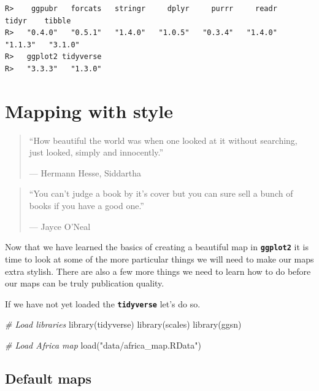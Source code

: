\documentclass[
]{book}
\newenvironment{Shaded}{\begin{snugshade}}{\end{snugshade}}
\newcommand{\CommentTok}[1]{\textcolor[rgb]{0.56,0.35,0.01}{\textit{#1}}}
\newcommand{\FunctionTok}[1]{\textcolor[rgb]{0.00,0.00,0.00}{#1}}
\newcommand{\NormalTok}[1]{#1}
\newcommand{\StringTok}[1]{\textcolor[rgb]{0.31,0.60,0.02}{#1}}
\begin{document}
\begin{verbatim}
R>    ggpubr   forcats   stringr     dplyr     purrr     readr     tidyr    tibble 
R>   "0.4.0"   "0.5.1"   "1.4.0"   "1.0.5"   "0.3.4"   "1.4.0"   "1.1.3"   "3.1.0" 
R>   ggplot2 tidyverse 
R>   "3.3.3"   "1.3.0"
\end{verbatim}

\hypertarget{mapping_style}{%
\chapter{Mapping with style}\label{mapping_style}}

\begin{quote}
``How beautiful the world was when one looked at it without searching, just looked, simply and innocently.''

--- Hermann Hesse, Siddartha
\end{quote}

\begin{quote}
``You can't judge a book by it's cover but you can sure sell a bunch of books if you have a good one.''

--- Jayce O'Neal
\end{quote}

Now that we have learned the basics of creating a beautiful map in \textbf{\texttt{ggplot2}} it is time to look at some of the more particular things we will need to make our maps extra stylish. There are also a few more things we need to learn how to do before our maps can be truly publication quality.

If we have not yet loaded the \textbf{\texttt{tidyverse}} let's do so.

\begin{Shaded}
\begin{Highlighting}[]
\CommentTok{\# Load libraries}
\FunctionTok{library}\NormalTok{(tidyverse)}
\FunctionTok{library}\NormalTok{(scales)}
\FunctionTok{library}\NormalTok{(ggsn)}

\CommentTok{\# Load Africa map}
\FunctionTok{load}\NormalTok{(}\StringTok{"data/africa\_map.RData"}\NormalTok{)}
\end{Highlighting}
\end{Shaded}

\hypertarget{default-maps}{%
\section{Default maps}\label{default-maps}}
\end{document}

